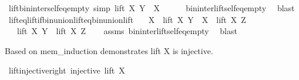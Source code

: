 \begin{isabellebody}
\isanewline
%
\endisadelimproof
\isanewline
{}\isamarkupfalse%
\ lift{\isacharunderscore}{\kern0pt}bin{\isacharunderscore}{\kern0pt}inter{\isacharunderscore}{\kern0pt}self{\isacharunderscore}{\kern0pt}eq{\isacharunderscore}{\kern0pt}empty\ {\isacharbrackleft}{\kern0pt}simp{\isacharbrackright}{\kern0pt}{\isacharcolon}{\kern0pt}\ {\isachardoublequoteopen}lift\ X\ Y\ {\isasyminter}\ X\ {\isacharequal}{\kern0pt}\ {\isacharbraceleft}{\kern0pt}{\isacharbraceright}{\kern0pt}{\isachardoublequoteclose}\isanewline
%
\isadelimproof
\ \ %
\endisadelimproof
%
\isatagproof
{}\isamarkupfalse%
\ bin{\isacharunderscore}{\kern0pt}inter{\isacharunderscore}{\kern0pt}lift{\isacharunderscore}{\kern0pt}self{\isacharunderscore}{\kern0pt}eq{\isacharunderscore}{\kern0pt}empty\ \isamarkupfalse%
\ blast%
\endisatagproof
{\isafoldproof}%
%
\isadelimproof
\isanewline
%
\endisadelimproof
\isanewline
{}\isamarkupfalse%
\ lift{\isacharunderscore}{\kern0pt}eq{\isacharunderscore}{\kern0pt}lift{\isacharunderscore}{\kern0pt}if{\isacharunderscore}{\kern0pt}bin{\isacharunderscore}{\kern0pt}union{\isacharunderscore}{\kern0pt}lift{\isacharunderscore}{\kern0pt}eq{\isacharunderscore}{\kern0pt}bin{\isacharunderscore}{\kern0pt}union{\isacharunderscore}{\kern0pt}lift{\isacharcolon}{\kern0pt}\isanewline
\ \ \ {\isachardoublequoteopen}X\ {\isasymunion}\ lift\ X\ Y\ {\isacharequal}{\kern0pt}\ X\ {\isasymunion}\ lift\ X\ Z{\isachardoublequoteclose}\isanewline
\ \ \ {\isachardoublequoteopen}lift\ X\ Y\ {\isacharequal}{\kern0pt}\ lift\ X\ Z{\isachardoublequoteclose}\isanewline
%
\isadelimproof
\ \ %
\endisadelimproof
%
\isatagproof
{}\isamarkupfalse%
\ assms\ bin{\isacharunderscore}{\kern0pt}inter{\isacharunderscore}{\kern0pt}lift{\isacharunderscore}{\kern0pt}self{\isacharunderscore}{\kern0pt}eq{\isacharunderscore}{\kern0pt}empty\ \isamarkupfalse%
\ blast%
\endisatagproof
{\isafoldproof}%
%
\isadelimproof
%
\endisadelimproof
%
\isadelimdocument
%
\endisadelimdocument
%
\isatagdocument
%
\isamarkuptrue%
%
\endisatagdocument
{\isafolddocument}%
%
\isadelimdocument
%
\endisadelimdocument
%
\begin{isamarkuptext}%
Based on mem\_induction demonstrates lift X is injective.%
\end{isamarkuptext}\isamarkuptrue%
\isamarkupfalse%
\ lift{\isacharunderscore}{\kern0pt}injective{\isacharunderscore}{\kern0pt}right{\isacharcolon}{\kern0pt}\ {\isachardoublequoteopen}injective\ {\isacharparenleft}{\kern0pt}lift\ X{\isacharparenright}{\kern0pt}{\isachardoublequoteclose}\isanewline

\end{isabellebody}
